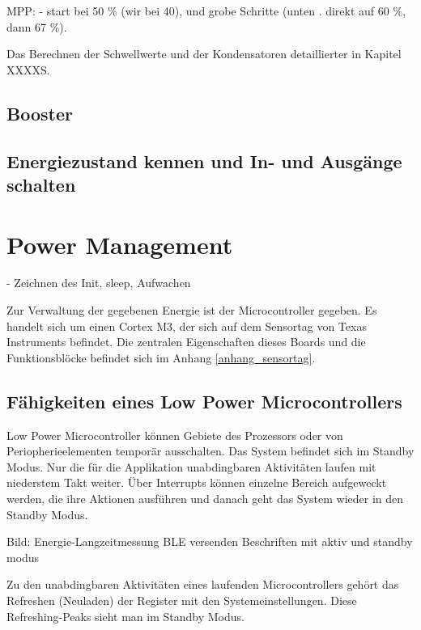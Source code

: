 MPP:
- start bei 50 \% (wir bei 40), und grobe Schritte (unten . direkt auf 60 \%, dann 67 \%). 


Das Berechnen der Schwellwerte und der Kondensatoren detaillierter in Kapitel XXXXS.

\subsection{Booster}

\subsection{Energiezustand kennen und In- und Ausgänge schalten}











\section{Power Management}\label{t_power_management} 
- Zeichnen des Init, sleep, Aufwachen

Zur Verwaltung der gegebenen Energie ist der Microcontroller gegeben. Es handelt sich um einen Cortex M3, der sich auf dem Sensortag von Texas Instruments befindet. Die zentralen Eigenschaften dieses Boards und die Funktionsblöcke befindet sich im Anhang \ref{anhang_sensortag}.

\subsection{Fähigkeiten eines Low Power Microcontrollers}
  
Low Power Microcontroller können Gebiete des Prozessors oder von Periopherieelementen temporär ausschalten. Das System befindet sich im Standby Modus. Nur die für die Applikation unabdingbaren Aktivitäten laufen mit niederstem Takt weiter. Über Interrupts können einzelne Bereich aufgeweckt werden, die ihre Aktionen ausführen und danach geht das System wieder in den Standby Modus.

Bild: Energie-Langzeitmessung BLE versenden
Beschriften mit aktiv und standby modus

Zu den unabdingbaren Aktivitäten eines laufenden Microcontrollers gehört das Refreshen (Neuladen) der Register mit den Systemeinstellungen. Diese Refreshing-Peaks sieht man im Standby Modus.



